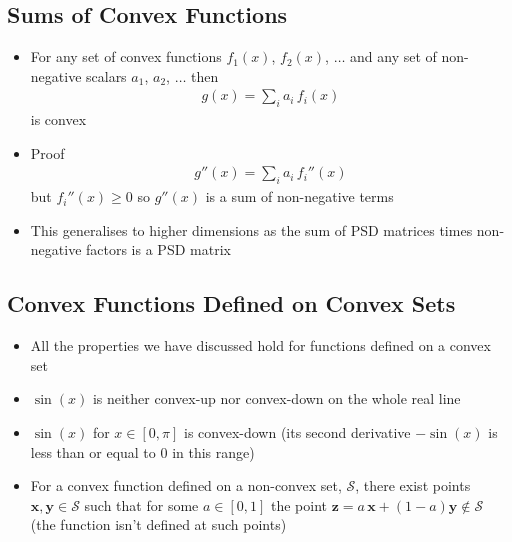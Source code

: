 
\begin{slide}
\section[-2]{Sums of Convex Functions}

\begin{PauseHighLight}
  \begin{itemize}
  \item For any set of convex functions $f_1(x)$, $f_2(x)$, $\ldots$
    and any set of non-negative scalars $a_1$, $a_2$, $\ldots$ then
    \begin{align*}
      g(x) = \sum_i a_i\,f_i(x)
    \end{align*}
    is convex\pause
  \item Proof
    \begin{align*}
      g''(x) = \sum_i a_i \, f_i''(x)
    \end{align*}
    but $f_i''(x)\geq 0$ so $g''(x)$ is a sum of non-negative
    terms\pause
  \item This generalises to higher dimensions as the sum of PSD
    matrices times non-negative factors is a PSD matrix\pause
  \end{itemize}
\end{PauseHighLight}
  

\end{slide}



\begin{slide}
\section[-2]{Convex Functions Defined on Convex Sets}

\pb
\begin{itemize}
\item All the properties we have discussed hold for functions
  defined on a convex set\pauseh
\item $\sin(x)$ is neither convex-up nor convex-down on the whole real line\pauseh
\item $\sin(x)$ for $x\in[0, \pi]$ is convex-down\pauseh{} (its second
  derivative $-\sin(x)$ is less than or equal to 0 in this
  range)\pause
  \begin{center}
    \pause
  \end{center}
\item For a convex function defined on a non-convex set,
  $\mathcal{S}$, there exist points $\bm{x},\bm{y} \in \mathcal{S}$
  such that for some $a\in[0,1]$ the point
  $\bm{z}=a\,\bm{x}+(1-a)\bm{y}\not\in\mathcal{S}$\pauseh{} (the
  function isn't defined at such points)\pause
\end{itemize}
  

\end{slide}

